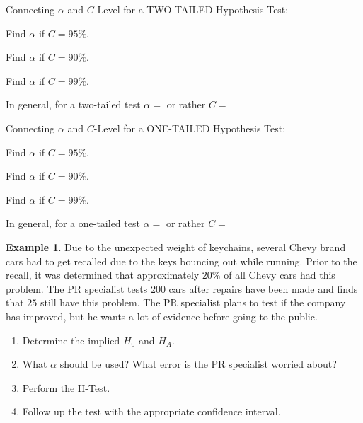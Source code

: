 \documentclass[12pt]{amsart}
\theoremstyle{definition}
\newtheorem{ex}{Example}
\begin{document}
 \begin{framed} Connecting $\alpha$ and $C$-Level for a TWO-TAILED Hypothesis Test:
 
 Find $\alpha$ if $C=95\%$.
 
 \vspace{1in}

  Find $\alpha$ if $C=90\%$.
 
 \vspace{0.75in}
 
  Find $\alpha$ if $C=99\%$.
 
 \vspace{0.75in}
 \end{framed}
In general, for a two-tailed test $\alpha=$\hspace{1in} or rather $C=$
\newpage
 \begin{framed} Connecting $\alpha$ and $C$-Level for a ONE-TAILED Hypothesis Test:
 
 Find $\alpha$ if $C=95\%$.
 
 \vspace{1in}

  Find $\alpha$ if $C=90\%$.
 
 \vspace{0.75in}
 
  Find $\alpha$ if $C=99\%$.
 
 \vspace{0.75in}
 \end{framed}
In general, for a one-tailed test $\alpha=$\hspace{1in} or rather $C=$
 ~\\
 \begin{ex} 
  Due to the unexpected weight of keychains, several Chevy brand cars had to get recalled due to the keys bouncing out while running. Prior to the recall, it was determined that approximately $20\%$ of all Chevy cars had this problem. The PR specialist tests $200$ cars after repairs have been made and finds that $25$ still have this problem. The PR specialist plans to test if the company has improved, but he wants a lot of evidence before going to the public.\\
  \begin{enumerate}
   \item Determine the implied $H_0$ and $H_A$.
   \item What $\alpha$ should be used? What error is the PR specialist worried about?
   \item Perform the H-Test.
   \item Follow up the test with the appropriate confidence interval.
  \end{enumerate}

 \end{ex}
\end{document}
